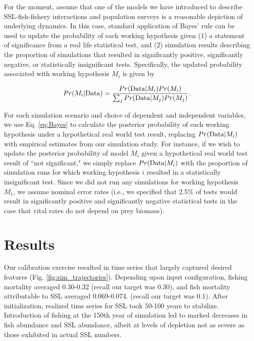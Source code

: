 \documentclass[nonumbib,leqno]{nrc1}
\begin{document}
For the moment, assume that one of the models we have introduced to describe SSL-fish-fishery interactions and population surveys is a reasonable depiction of underlying dynamics.  In this case, standard application of Bayes' rule can be used to update the probability of each working hypothesis given (1) a statement of significance from a real life statistical test, and (2) simulation results describing the proportion of simulations that resulted in significantly positive, significantly negative, or statistically insignificant tests.  Specifically, the updated probability associated with working hypothesis $M_i$ is given by
\begin{linenomath}
  \begin{equation}
     \label{eq:Bayes}
     Pr(M_i | {\rm Data}) = \frac{Pr({\rm Data}|M_i)Pr(M_i)}{\sum_j Pr({\rm Data}|M_j)Pr(M_j)}.
  \end{equation}
\end{linenomath}
For each simulation scenario and choice of dependent and independent variables, we use Eq. \ref{eq:Bayes} to calculate the posterior probability of each working hypothesis under a hypothetical real world test result, replacing $Pr({\rm Data}|M_i)$ with empirical estimates from our simulation study.  For instance, if we wish to update the posterior probability of model $M_i$ given a hypothetical real world test result of ``not significant," we simply replace $Pr({\rm Data}|M_i)$ with the proportion of simulation runs for which working hypothesis $i$ resulted in a statistically insignificant test.  Since we did not run any simulations for working hypothesis $M_1$, we assume nominal error rates (i.e., we specified that 2.5\% of tests would result in significantly positive and significantly negative statistical tests in the case that vital rates do not depend on prey biomass).

\section{Results}

Our calibration exercise resulted in time series that largely captured desired features (Fig. \ref{fig:sim_trajectories}).  Depending upon input configuration, fishing mortality averaged 0.30-0.32 (recall our target was 0.30), and fish mortality attributable to SSL averaged 0.069-0.074.  (recall our target was 0.1).  After initialization, realized time series for SSL took 50-100 years to stabilize.  Introduction of fishing at the 150th year of simulation led to marked decreases in fish abundance and SSL abundance, albeit at levels of depletion not as severe as those exhibited in actual SSL numbers.
\end{document}
